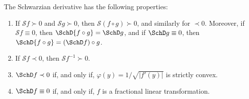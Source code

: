 \documentclass[../main]{subfiles}
\begin{document}
\begin{proposition}\label{prop:schwarzian}
  The Schwarzian derivative has the following properties:
  \begin{enumerate}
  \item\label{prop:schwarzian:item:1}
    If \(\mathcal{S}f \succ 0\) and \(\mathcal{S}g \succ 0\), then \(\mathcal{S}(f \circ g) \succ 0\), and similarly for \(\prec 0\). Moreover, if \(\mathcal{S}f \equiv 0\), then \(\SchD{f \circ g} = \SchD g\), and if \(\SchD g \equiv 0\), then \(\SchD{f \circ g} = (\SchD f) \circ g\).
  \item If \(\mathcal{S}f \prec 0\), then \(\mathcal{S}f^{-1} \succ 0\). 
  \item\label{prop:schwarzian:item:3} \(\SchD f \prec 0\) if, and only if, \(\varphi(y) = 1/ \sqrt{\lvert f'(y) \rvert}\) is strictly convex.
  \item \(\SchD f \equiv 0\) if, and only if, \(f\) is a fractional linear transformation.
  \end{enumerate}
\end{proposition}
\end{document}
